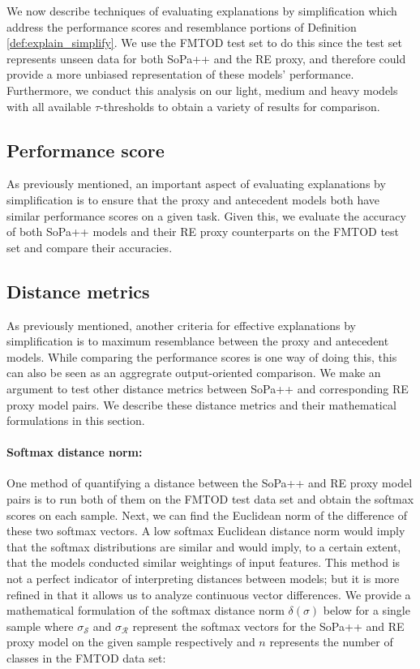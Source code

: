 We now describe techniques of evaluating explanations by simplification which
address the performance scores and resemblance portions of Definition
\ref{def:explain_simplify}. We use the FMTOD test set to do this since the test
set represents unseen data for both SoPa++ and the RE proxy, and therefore could
provide a more unbiased representation of these models' performance.
Furthermore, we conduct this analysis on our light, medium and heavy models with
all available $\tau$-thresholds to obtain a variety of results for comparison.

\subsection{Performance score}

As previously mentioned, an important aspect of evaluating explanations by
simplification is to ensure that the proxy and antecedent models both have
similar performance scores on a given task. Given this, we evaluate the accuracy
of both SoPa++ models and their RE proxy counterparts on the FMTOD test set and
compare their accuracies.

\subsection{Distance metrics}

As previously mentioned, another criteria for effective explanations by
simplification is to maximum resemblance between the proxy and antecedent
models. While comparing the performance scores is one way of doing this, this
can also be seen as an aggregrate output-oriented comparison. We make an
argument to test other distance metrics between SoPa++ and corresponding RE
proxy model pairs. We describe these distance metrics and their mathematical
formulations in this section.

\paragraph{Softmax distance norm:} One method of quantifying a distance between
the SoPa++ and RE proxy model pairs is to run both of them on the FMTOD test
data set and obtain the softmax scores on each sample. Next, we can find the
Euclidean norm of the difference of these two softmax vectors. A low softmax
Euclidean distance norm would imply that the softmax distributions are similar
and would imply, to a certain extent, that the models conducted similar
weightings of input features. This method is not a perfect indicator of
interpreting distances between models; but it is more refined in that it allows
us to analyze continuous vector differences. We provide a mathematical
formulation of the softmax distance norm $\delta(\sigma)$ below for a single
sample where $\sigma_{\mathcal{S}}$ and $\sigma_{\mathcal{R}}$ represent the
softmax vectors for the SoPa++ and RE proxy model on the given sample
respectively and $n$ represents the number of classes in the FMTOD data set:

